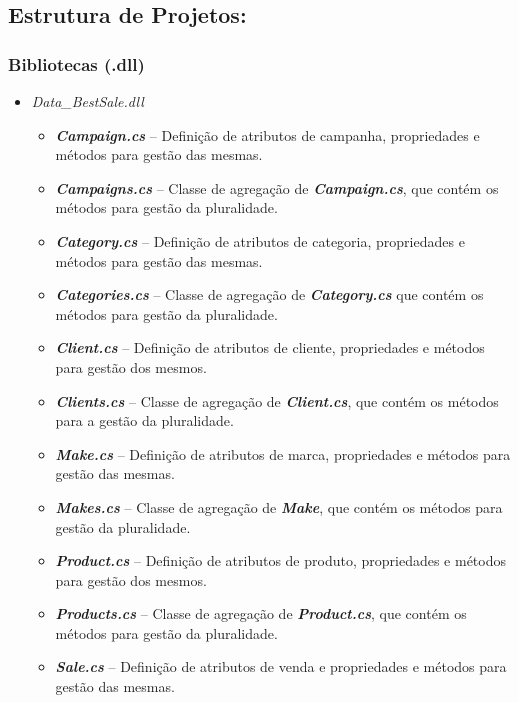 \documentclass[11pt]{scrartcl} %
\begin{document}
\newpage

\subsection{Estrutura de Projetos:}
\subsubsection{Bibliotecas (.dll)}
\begin{itemize}
	\item \textit{Data\_BestSale.dll}
		\begin{itemize}
			\item
			\emph{\textbf{Campaign.cs}} -- Definição de atributos de campanha,
			propriedades e métodos para gestão das mesmas.
			\item
			\emph{\textbf{Campaigns.cs}} -- Classe de agregação de
			\emph{\textbf{Campaign.cs}}, que contém os métodos para gestão da
			pluralidade.
			\item
			\emph{\textbf{Category.cs}} -- Definição de atributos de categoria,
			propriedades e métodos para gestão das mesmas.
			\item
			\emph{\textbf{Categories.cs}} -- Classe de agregação de
			\emph{\textbf{Category.cs}} que contém os métodos para gestão da
			pluralidade.
			\item
			\emph{\textbf{Client.cs}} -- Definição de atributos de cliente,
			propriedades e métodos para gestão dos mesmos.
			\item
			\emph{\textbf{Clients.cs}} -- Classe de agregação de
			\emph{\textbf{Client.cs}}, que contém os métodos para a gestão da
			pluralidade.
			\item
			\emph{\textbf{Make.cs}} -- Definição de atributos de marca, propriedades
			e métodos para gestão das mesmas.
			\item
			\emph{\textbf{Makes.cs}} -- Classe de agregação de \emph{\textbf{Make}},
			que contém os métodos para gestão da pluralidade.
			\item
			\emph{\textbf{Product.cs}} -- Definição de atributos de produto,
			propriedades e métodos para gestão dos mesmos.
			\item
			\emph{\textbf{Products.cs}} -- Classe de agregação de
			\emph{\textbf{Product.cs}}, que contém os métodos para gestão da
			pluralidade.
			\item
			\emph{\textbf{Sale.cs}} -- Definição de atributos de venda e propriedades
			e métodos para gestão das mesmas.

\end{itemize}
\end{itemize}
\end{document}
